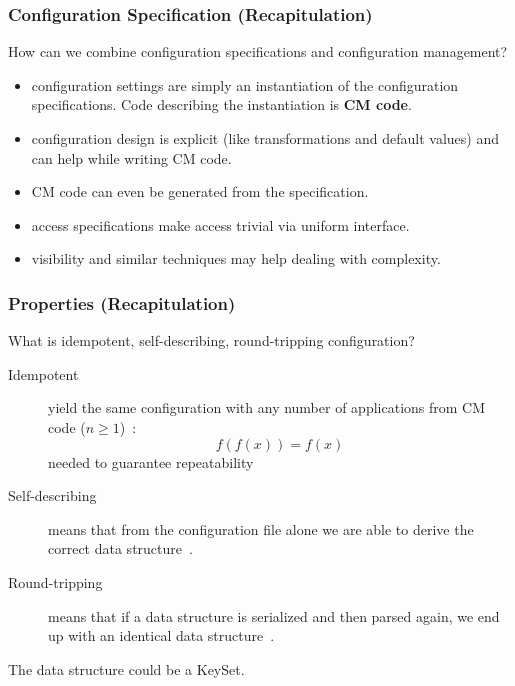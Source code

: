 \begin{frame}
	\frametitle{Configuration Specification (Recapitulation)}

	\begin{task}
	How can we combine configuration specifications and configuration management?
	\end{task}

	\pause

	\begin{itemize} %
	\item configuration settings are simply an instantiation of the configuration specifications.
		Code describing the instantiation is \textbf{CM code}.
	\item configuration design is explicit (like transformations and default values) and can help while writing CM code.
	\item CM code can even be generated from the specification.
	\item access specifications make access trivial via uniform interface.
	\item visibility and similar techniques may help dealing with complexity.
	\end{itemize}
\end{frame}

\begin{frame}
	\frametitle{Properties (Recapitulation)}

	\begin{task}
	What is idempotent, self-describing, round-tripping configuration?
	\end{task}

	\pause


	\begin{description}
	\item[Idempotent]
	yield the same configuration with any number of applications from CM code ($n\ge1$)~\cite{waldemar2013testing}:
	\[
		f(f(x))=f(x)
	\]
	needed to guarantee repeatability

	\item[Self-describing]
	means that from the configuration file alone we are able to derive the correct data structure~\cite{wadler2003xml}.

	\item[Round-tripping]
	means that if a data structure is serialized and then parsed again, we end up with an identical data structure~\cite{wadler2003xml}.
	\end{description}

	The data structure could be a KeySet.
\end{frame}

